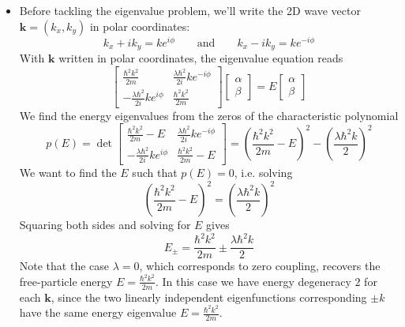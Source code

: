 \documentclass[11pt, a4paper]{article}
\newcommand{\eqtext}[1]{\qquad \text{#1} \qquad}
\renewcommand{\vec}[1]{\bm{#1}} %
\renewcommand{\k}{\vec{k}}  %
\begin{document}
\begin{itemize}
	\item Before tackling the eigenvalue problem, we'll write the 2D wave vector $ \vec{k} = (k_{x}, k_{y}) $ in polar coordinates:
	\begin{equation*}
		k_{x} + ik_{y} = ke^{i\phi} \eqtext{and} k_{x} - ik_{y} = ke^{-i\phi}
	\end{equation*}
	With $ \k $ written in polar coordinates, the eigenvalue equation reads
	\begin{equation*}
		\begin{bmatrix}
		\frac{\hbar^{2}k^{2}}{2m} & \frac{\lambda \hbar^{2}}{2i}ke^{-i\phi} \\[1mm]
		-\frac{\lambda \hbar^{2}}{2i}ke^{i\phi} & \frac{\hbar^{2}k^{2}}{2m}
		\end{bmatrix}
		\begin{bmatrix}
			\alpha\\
			\beta
		\end{bmatrix}
		= E
		\begin{bmatrix}
			\alpha\\
			\beta
		\end{bmatrix}
	\end{equation*}
	We find the energy eigenvalues from the zeros of the characteristic polynomial
	\begin{equation*}
		p(E) = \det 
		\begin{bmatrix}
		\frac{\hbar^{2}k^{2}}{2m} - E & \frac{\lambda \hbar^{2}}{2i}ke^{-i\phi} \\[1mm]
		-\frac{\lambda \hbar^{2}}{2i}ke^{i\phi} & \frac{\hbar^{2}k^{2}}{2m} - E
		\end{bmatrix}
		= \left( \frac{\hbar^{2}k^{2}}{2m} - E\right)^{2} - \left(\frac{\lambda \hbar^{2}k}{2}\right)^{2} 
	\end{equation*}	
	We want to find the $ E $ such that $ p(E) = 0 $, i.e. solving
	\begin{equation*}
		\left( \frac{\hbar^{2}k^{2}}{2m} - E\right)^{2} = \left(\frac{\lambda \hbar^{2}k}{2}\right)^{2} 
	\end{equation*}
	Squaring both sides and solving for $ E $ gives
	\begin{equation*}
		E_{\pm} = \frac{\hbar^{2}k^{2}}{2m} \pm \frac{\lambda \hbar^{2}k}{2}
	\end{equation*}
	Note that the case $ \lambda = 0 $, which corresponds to zero coupling, recovers the free-particle energy $ E = \frac{\hbar^{2}k^{2}}{2m} $. In this case we have energy degeneracy $ 2 $ for each $ \k $, since the two linearly independent eigenfunctions corresponding $ \pm k $ have the same energy eigenvalue $ E = \frac{\hbar^{2}k^{2}}{2m} $.
	

\end{itemize}
\end{document}
